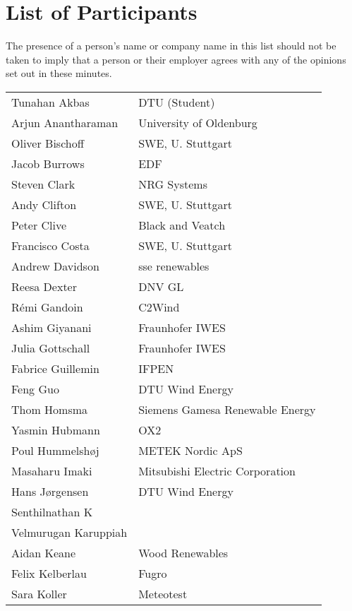 \section{List of Participants}

The presence of a person's name or company name in this list should not be taken to imply that a person or their employer agrees with any of the opinions set out in these minutes.

\begin{supertabular}{@{}|p{0.45\columnwidth}|p{0.55\columnwidth}|@{}}
Tunahan Akbas & DTU (Student) \\
Arjun Anantharaman & University of Oldenburg \\
Oliver Bischoff & SWE, U. Stuttgart \\
 Jacob Burrows & EDF \\
 Steven Clark & NRG Systems \\
 Andy Clifton & SWE, U. Stuttgart \\
 Peter Clive & Black and Veatch \\
 Francisco Costa & SWE, U. Stuttgart \\
 Andrew Davidson & sse renewables \\
 Reesa Dexter & DNV GL \\
 Rémi Gandoin & C2Wind \\
 Ashim Giyanani & Fraunhofer IWES \\
 Julia Gottschall & Fraunhofer IWES \\
 Fabrice Guillemin & IFPEN \\
 Feng Guo & DTU Wind Energy \\
 Thom Homsma & Siemens Gamesa Renewable Energy \\
 Yasmin Hubmann & OX2\\
 Poul Hummelshøj & METEK Nordic ApS \\
 Masaharu Imaki & Mitsubishi Electric Corporation \\
 Hans Jørgensen & DTU Wind Energy \\
 Senthilnathan K & \\
 Velmurugan Karuppiah & \\
 Aidan Keane & Wood Renewables \\
 Felix Kelberlau & Fugro \\
 Sara Koller & Meteotest \\

\end{supertabular}
